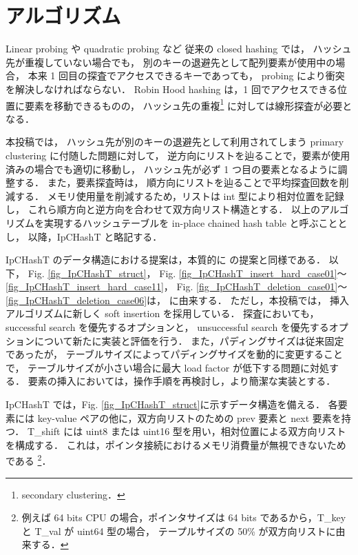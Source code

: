 \chapter{アルゴリズム}
\label{chap_Algorism}

Linear probing や quadratic probing など
従来の closed hashing では，
ハッシュ先が重複していない場合でも，
別のキーの退避先として配列要素が使用中の場合，
本来 1 回目の探査でアクセスできるキーであっても，
probing により衝突を解決しなければならない．
Robin Hood hashing は，1 回でアクセスできる位置に要素を移動できるものの，
ハッシュ先の重複\footnote{secondary clustering．} に対しては線形探査が必要となる．

本投稿では，
ハッシュ先が別のキーの退避先として利用されてしまう primary clustering に付随した問題に対して，
逆方向にリストを辿ることで，要素が使用済みの場合でも適切に移動し，
ハッシュ先が必ず 1 つ目の要素となるように調整する．
また，要素探査時は，
順方向にリストを辿ることで平均探査回数を削減する．
メモリ使用量を削減するため，リストは int 型により相対位置を記録し，
これら順方向と逆方向を合わせて双方向リスト構造とする．
以上のアルゴリズムを実現するハッシュテーブルを in-place chained hash table と呼ぶこととし，
以降，IpCHashT と略記する．

IpCHashT のデータ構造における提案は，本質的に \cite{ADMIS2017} の提案と同様である．
以下，
Fig. \ref{fig_IpCHashT_struct}，
Fig. \ref{fig_IpCHashT_insert_hard_case01}〜\ref{fig_IpCHashT_insert_hard_case11}，
Fig. \ref{fig_IpCHashT_deletion_case01}〜\ref{fig_IpCHashT_deletion_case06}は，
\cite{ADMIS2017} に由来する．
ただし，本投稿では，
挿入アルゴリズムに新しく soft insertion を採用している．
探査においても，
successful search を優先するオプションと，
unsuccessful search を優先するオプションについて新たに実装と評価を行う．
また，パディングサイズは従来固定であったが，
テーブルサイズによってパディングサイズを動的に変更することで，
テーブルサイズが小さい場合に最大 load factor が低下する問題に対処する．
要素の挿入においては，操作手順を再検討し，より簡潔な実装とする．

IpCHashT では，Fig. \ref{fig_IpCHashT_struct}に示すデータ構造を備える．
各要素には key-value ペアの他に，双方向リストのための prev 要素と next 要素を持つ．
T\_shift には uint8 または uint16 型を用い，相対位置による双方向リストを構成する．
これは，ポインタ接続におけるメモリ消費量が無視できないためである
\footnote{
  例えば 64 bits CPU の場合，ポインタサイズは 64 bits であるから，T\_key と T\_val が uint64 型の場合，
  テープルサイズの 50\% が双方向リストに由来する．
}．

